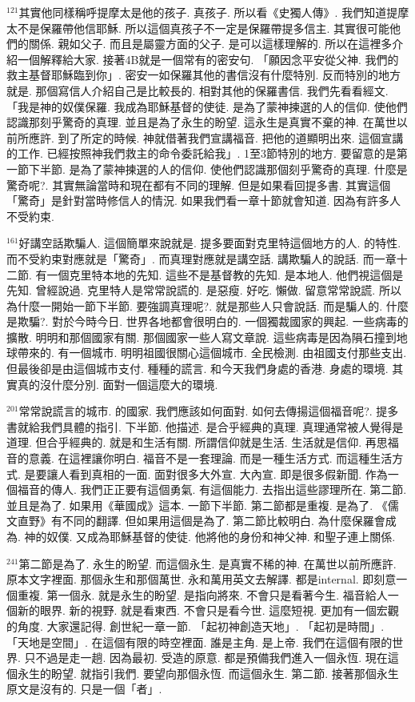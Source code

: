 \documentclass{book}
\begin{document}
$^{121}$其實他同樣稱呼提摩太是他的孩子.
真孩子.
所以看《史獨人傳》.
我們知道提摩太不是保羅帶他信耶穌.
所以這個真孩子不一定是保羅帶提多信主.
其實很可能他們的關係.
親如父子.
而且是屬靈方面的父子.
是可以這樣理解的.
所以在這裡多介紹一個解釋給大家.
接著4B就是一個常有的密安句.
「願因念平安從父神.
我們的救主基督耶穌臨到你」.
密安一如保羅其他的書信沒有什麼特別.
反而特別的地方就是.
那個寫信人介紹自己是比較長的.
相對其他的保羅書信.
我們先看看經文.
「我是神的奴僕保羅.
我成為耶穌基督的使徒.
是為了蒙神揀選的人的信仰.
使他們認識那刻乎驚奇的真理.
並且是為了永生的盼望.
這永生是真實不棄的神.
在萬世以前所應許.
到了所定的時候.
神就借著我們宣講福音.
把他的道顯明出來.
這個宣講的工作.
已經按照神我們救主的命令委託給我」.
1至3節特別的地方.
要留意的是第一節下半節.
是為了蒙神揀選的人的信仰.
使他們認識那個刻乎驚奇的真理.
什麼是驚奇呢?.
其實無論當時和現在都有不同的理解.
但是如果看回提多書.
其實這個「驚奇」是針對當時修信人的情況.
如果我們看一章十節就會知道.
因為有許多人不受約束.

$^{161}$好講空話欺騙人.
這個簡單來說就是.
提多要面對克里特這個地方的人.
的特性.
而不受約束對應就是「驚奇」.
而真理對應就是講空話.
講欺騙人的說話.
而一章十二節.
有一個克里特本地的先知.
這些不是基督教的先知.
是本地人.
他們視這個是先知.
曾經說過.
克里特人是常常說謊的.
是惡瘦.
好吃.
懶做.
留意常常說謊.
所以為什麼一開始一節下半節.
要強調真理呢?.
就是那些人只會說話.
而是騙人的.
什麼是欺騙?.
對於今時今日.
世界各地都會很明白的.
一個獨裁國家的興起.
一些病毒的擴散.
明明和那個國家有關.
那個國家一些人寫文章說.
這些病毒是因為隕石撞到地球帶來的.
有一個城市.
明明祖國很關心這個城市.
全民檢測.
由祖國支付那些支出.
但最後卻是由這個城市支付.
種種的謊言.
和今天我們身處的香港.
身處的環境.
其實真的沒什麼分別.
面對一個這麼大的環境.

$^{201}$常常說謊言的城市.
的國家.
我們應該如何面對.
如何去傳揚這個福音呢?.
提多書就給我們具體的指引.
下半節.
他描述.
是合乎經典的真理.
真理通常被人覺得是道理.
但合乎經典的.
就是和生活有關.
所謂信仰就是生活.
生活就是信仰.
再思福音的意義.
在這裡讓你明白.
福音不是一套理論.
而是一種生活方式.
而這種生活方式.
是要讓人看到真相的一面.
面對很多大外宣.
大內宣.
即是很多假新聞.
作為一個福音的傳人.
我們正正要有這個勇氣.
有這個能力.
去指出這些謬理所在.
第二節.
並且是為了.
如果用《華國成》這本.
一節下半節.
第二節都是重複.
是為了.
《儒文直野》有不同的翻譯.
但如果用這個是為了.
第二節比較明白.
為什麼保羅會成為.
神的奴僕.
又成為耶穌基督的使徒.
他將他的身份和神父神.
和聖子連上關係.

$^{241}$第二節是為了.
永生的盼望.
而這個永生.
是真實不稀的神.
在萬世以前所應許.
原本文字裡面.
那個永生和那個萬世.
永和萬用英文去解譯.
都是internal.
即刻意一個重複.
第一個永.
就是永生的盼望.
是指向將來.
不會只是看著今生.
福音給人一個新的眼界.
新的視野.
就是看東西.
不會只是看今世.
這麼短視.
更加有一個宏觀的角度.
大家還記得.
創世紀一章一節.
「起初神創造天地」.
「起初是時間」.
「天地是空間」.
在這個有限的時空裡面.
誰是主角.
是上帝.
我們在這個有限的世界.
只不過是走一趟.
因為最初.
受造的原意.
都是預備我們進入一個永恆.
現在這個永生的盼望.
就指引我們.
要望向那個永恆.
而這個永生.
第二節.
接著那個永生原文是沒有的.
只是一個「者」.
\end{document}
